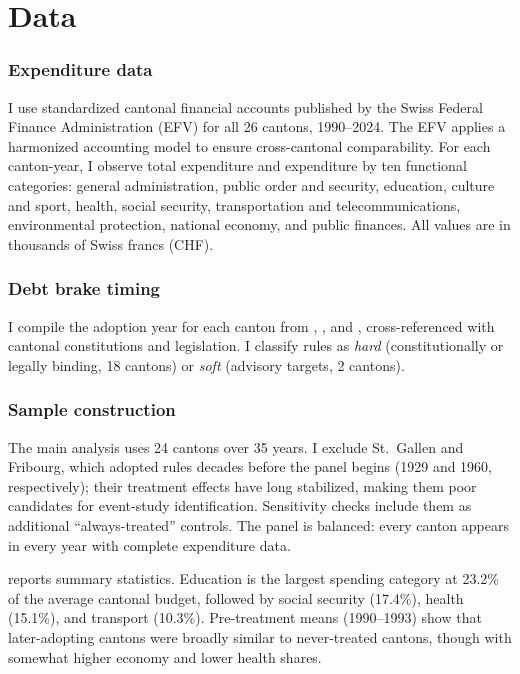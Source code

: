 \documentclass[12pt]{article}
\begin{document}
\section{Data}\label{sec:data}

\subsubsection*{Expenditure data} I use standardized cantonal financial accounts published by the Swiss Federal Finance Administration (EFV) for all 26 cantons, 1990--2024. The EFV applies a harmonized accounting model to ensure cross-cantonal comparability. For each canton-year, I observe total expenditure and expenditure by ten functional categories: general administration, public order and security, education, culture and sport, health, social security, transportation and telecommunications, environmental protection, national economy, and public finances. All values are in thousands of Swiss francs (CHF).

\subsubsection*{Debt brake timing} I compile the adoption year for each canton from \citet{feld2008fiscal}, \citet{luechinger2013fiscal}, and \citet{burret2018multidimensional}, cross-referenced with cantonal constitutions and legislation. I classify rules as \textit{hard} (constitutionally or legally binding, 18 cantons) or \textit{soft} (advisory targets, 2 cantons).

\subsubsection*{Sample construction} The main analysis uses 24 cantons over 35 years. I exclude St.\ Gallen and Fribourg, which adopted rules decades before the panel begins (1929 and 1960, respectively); their treatment effects have long stabilized, making them poor candidates for event-study identification. Sensitivity checks include them as additional ``always-treated'' controls. The panel is balanced: every canton appears in every year with complete expenditure data.

 reports summary statistics. Education is the largest spending category at 23.2\% of the average cantonal budget, followed by social security (17.4\%), health (15.1\%), and transport (10.3\%). Pre-treatment means (1990--1993) show that later-adopting cantons were broadly similar to never-treated cantons, though with somewhat higher economy and lower health shares.
\end{document}

